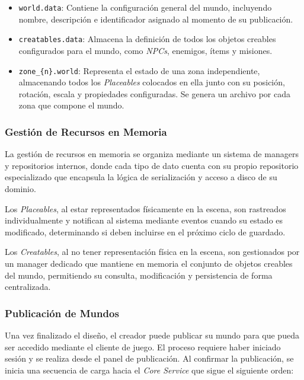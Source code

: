 \begin{itemize}
  \item \texttt{world.data}: Contiene la configuración general del mundo, incluyendo nombre, descripción
  e identificador asignado al momento de su publicación.
  \item \texttt{creatables.data}: Almacena la definición de todos los objetos creables configurados
  para el mundo, como \textit{NPCs}, enemigos, ítems y misiones.
  \item \texttt{zone\_\{n\}.world}: Representa el estado de una zona independiente, almacenando todos
  los \textit{Placeables} colocados en ella junto con su posición, rotación, escala y propiedades configuradas.
  Se genera un archivo por cada zona que compone el mundo.
\end{itemize}


\subsubsection{Gestión de Recursos en Memoria}

La gestión de recursos en memoria se organiza mediante un sistema de managers y repositorios internos, 
donde cada tipo de dato cuenta con su propio repositorio especializado que encapsula la lógica de 
serialización y acceso a disco de su dominio.

Los \textit{Placeables}, al estar representados físicamente en la escena, son rastreados individualmente y 
notifican al sistema mediante eventos cuando su estado es modificado, determinando si deben incluirse 
en el próximo ciclo de guardado.

Los \textit{Creatables}, al no tener representación física en la escena, son gestionados por un manager dedicado 
que mantiene en memoria el conjunto de objetos creables del mundo, permitiendo su consulta, modificación 
y persistencia de forma centralizada.

\subsubsection{Publicación de Mundos}

Una vez finalizado el diseño, el creador puede publicar su mundo para que pueda ser accedido mediante el cliente de juego.
El proceso requiere haber iniciado sesión y se realiza desde el panel de publicación. Al confirmar la publicación,
se inicia una secuencia de carga hacia el \textit{Core Service} que sigue el siguiente orden:

